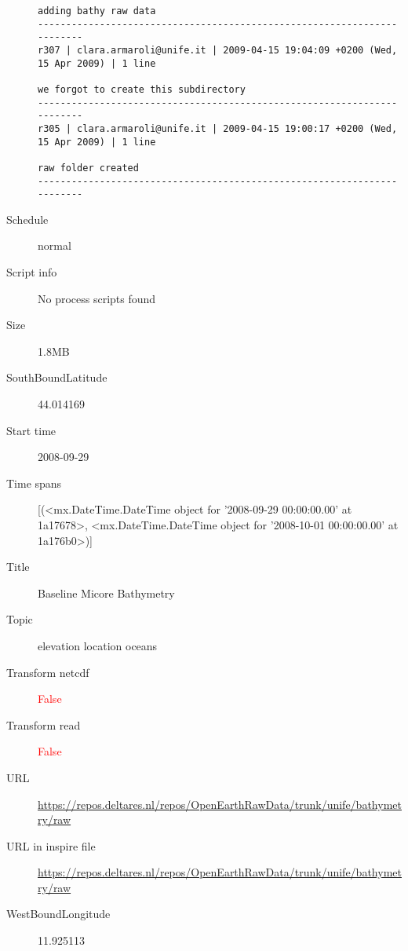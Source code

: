 \documentclass[9]{report}
\begin{document}
\begin{description}
\begin{verbatim}
adding bathy raw data
------------------------------------------------------------------------
r307 | clara.armaroli@unife.it | 2009-04-15 19:04:09 +0200 (Wed, 15 Apr 2009) | 1 line

we forgot to create this subdirectory
------------------------------------------------------------------------
r305 | clara.armaroli@unife.it | 2009-04-15 19:00:17 +0200 (Wed, 15 Apr 2009) | 1 line

raw folder created
------------------------------------------------------------------------

\end{verbatim}
  \item[Schedule] normal
  \item[Script info] No process scripts found
  \item[Size] 1.8MB
  \item[SouthBoundLatitude] 44.014169
  \item[Start time] 2008-09-29
  \item[Time spans] [(<mx.DateTime.DateTime object for '2008-09-29 00:00:00.00' at 1a17678>, <mx.DateTime.DateTime object for '2008-10-01 00:00:00.00' at 1a176b0>)]
  \item[Title]  Baseline Micore Bathymetry 
  \item[Topic] elevation location oceans
  \item[Transform netcdf] \textcolor{red}{False}
  \item[Transform read] \textcolor{red}{False}
  \item[URL] \href{https://repos.deltares.nl/repos/OpenEarthRawData/trunk/unife/bathymetry/raw}{https://repos.deltares.nl/repos/OpenEarthRawData/trunk/unife/bathymetry/raw}
  \item[URL in inspire file] \href{https://repos.deltares.nl/repos/OpenEarthRawData/trunk/unife/bathymetry/raw}{https://repos.deltares.nl/repos/OpenEarthRawData/trunk/unife/bathymetry/raw}
  \item[WestBoundLongitude] 11.925113
\end{description}
\end{document}
